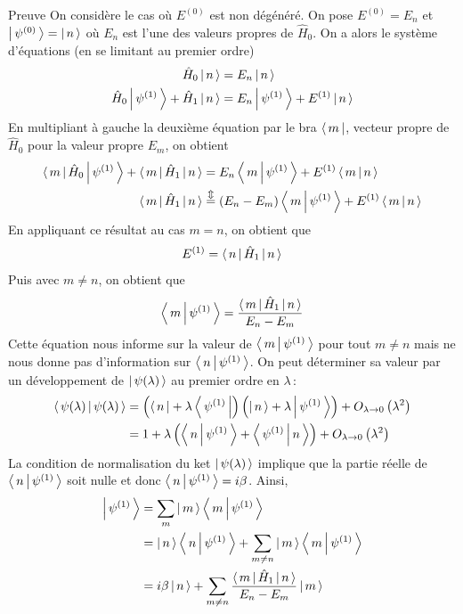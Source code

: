     \begin{demo}{Preuve}
    On considère le cas où $E^{(0)}$ est non dégénéré. On pose $E^{(0)} = E_n$ et $\left| \, \psi^{(0)} \, \right> = \left| \, n \, \right>$ où $E_n$ est l’une des valeurs propres de $\hat{H}_0$. On a alors le système d’équations (en se limitant au premier ordre)
    \begin{align*}
        \hat{H}_0 \left| \, n \, \right> &= E_n \left| \, n \, \right> \\
        \hat{H}_0 \left| \, \psi^{(1)} \, \right> + \hat{H}_1 \left| \, n \, \right> &= E_n \left| \, \psi^{(1)} \, \right> + E^{(1)} \left| \, n \, \right>
    \end{align*}
    En multipliant à gauche la deuxième équation par le bra $\left< \, m \, \right|$, vecteur propre de $\hat{H}_0$ pour la valeur propre $E_m$, on obtient 
    \begin{align*}
        \left< \, m \, \right| \hat{H}_0 \left| \, \psi^{(1)} \, \right> + \left< \, m \, \right| \hat{H}_1 \left| \, n \, \right> &= E_n \left< \, m \, \middle| \, \psi^{(1)} \, \right> + E^{(1)} \left< \, m \, \middle| \, n \, \right> \\
        \left< \, m \, \right| \hat{H}_1 \left| \, n \, \right> &\overset{\Updownarrow}{=} (E_n - E_m) \left< \, m \, \middle| \, \psi^{(1)} \, \right> + E^{(1)} \left< \, m \, \middle| \, n \, \right>
    \end{align*}
    En appliquant ce résultat au cas $m = n$, on obtient que 
    \[ E^{(1)} = \left< \, n \, \right| \hat{H}_1 \left| \, n \, \right> \]   
    Puis avec $m \neq n$, on obtient que 
    \[ \left< \, m \, \middle| \, \psi^{(1)} \, \right> = \frac{\left< \, m \, \right| \hat{H}_1 \left| \, n \, \right>}{E_n - E_m} \] 
    Cette équation nous informe sur la valeur de $\left< \, m \, \middle| \, \psi^{(1)} \, \right>$ pour tout $m \neq n$ mais ne nous donne pas d’information sur $\left< \, n \, \middle| \, \psi^{(1)} \, \right>$. On peut déterminer sa valeur par un développement de $\left| \, \psi(\lambda) \, \right>$ au premier ordre en $\lambda$ :
    \begin{align*}
        \left< \, \psi(\lambda) \, \middle| \, \psi(\lambda) \, \right>
        &= \left(\left< \, n \, \right| + \lambda \left< \, \psi^{(1)} \, \right|\right) \left(\left| \, n \, \right> + \lambda \left| \, \psi^{(1)} \, \right>\right) + O_{\lambda \to 0} \left(\lambda^2\right) \\
        &= 1 + \lambda \left(\left< \, n \, \middle| \, \psi^{(1)} \, \right> + \left< \, \psi^{(1)} \, \middle| \, n \, \right>\right) + O_{\lambda \to 0} \left(\lambda^2\right)
    \end{align*}
    La condition de normalisation du ket $\left| \, \psi(\lambda) \, \right>$ implique que la partie réelle de $\left< \, n \, \middle| \, \psi^{(1)} \, \right>$ soit nulle et donc $\left< \, n \, \middle| \, \psi^{(1)} \, \right> = i \beta$. Ainsi, 
    \begin{align*}
        \ket{\psi^{(1)}}
        &= \sum_{m} \ket{m} \spr{m}{\psi^{(1)}} \\
        &= \ket{n}\spr{n}{\psi^{(1)}} + \sum_{m \neq n} \ket{m} \spr{m}{\psi^{(1)}} \\
        &= i \beta \ket{n} + \sum_{m \neq n} \frac{\bra{m} \hat{H}_1 \ket{n}}{E_n - E_m} \ket{m}

\end{align*}
\end{demo}
